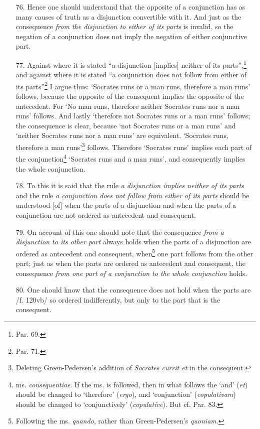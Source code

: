 \documentclass[]{article}
\begin{document}
\begin{enumerate}
\item[76.] Hence one should understand that the opposite of a conjunction has as many causes of truth as a disjunction convertible with it. And just as the consequence \textit{from the disjunction to either of its parts} is invalid, so the negation of a conjunction does not imply the negation of either conjunctive part.
\item[77.] Against where it is stated ``a disjunction [implies] neither of its parts'',\footnote{Par. 69.} and against where it is stated ``a conjunction does not follow from either of its parts''\footnote{Par. 71.} I argue thus: `Socrates runs or a man runs, therefore a man runs' follows, because the opposite of the consequent implies the opposite of the antecedent. For `No man runs, therefore neither Socrates runs nor a man runs' follows. And lastly `therefore not Socrates runs or a man runs' follows; the consequence is clear, because `not Socrates runs or a man runs' and `neither Socrates runs nor a man runs' are equivalent. `Socrates runs, therefore a man runs'\footnote{Deleting Green-Pedersen's addition of \textit{Socrates currit et} in the consequent.} follows. Therefore `Socrates runs' implies each part of the conjunction\footnote{ms. \textit{consequentiae}. If the ms. is followed, then in what follows the `and' (\textit{et})  should be changed to `therefore' (\textit{ergo}), and `conjunction' (\textit{copulativam}) should be changed to `conjunctively' (\textit{copulative}). But cf. Par. 83.} `Socrates runs and a man runs', and consequently implies the whole conjunction.
\item[78.] To this it is said that the rule \textit{a disjunction implies neither of its parts} and the rule \textit{a conjunction does not follow from either of its parts} should be understood [of] when the parts of a disjunction and when the parts of a conjunction are not ordered as antecedent and consequent.
\item[79.] On account of this one should note that the consequence \textit{from a disjunction to its other part} always holds when the  parts of a disjunction are ordered as antecedent and consequent, when\footnote{Following the ms. \textit{quando}, rather than Green-Pedersen's \textit{quoniam}.} one part follows from the other part; just as when the parts are ordered as antecedent and consequent, the consequence \textit{from one part of a conjunction to the whole conjunction} holds.
\item[80.] One should know that the consequence does not hold when the parts are /f. 120vb/ so ordered indifferently, but only to the part that is the consequent.

\end{enumerate}
\end{document}
